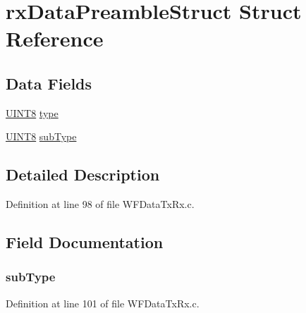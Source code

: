 \hypertarget{structrx_data_preamble_struct}{}\section{rx\+Data\+Preamble\+Struct Struct Reference}
\label{structrx_data_preamble_struct}
\subsection*{Data Fields}
\begin{DoxyCompactItemize}
\item 
\hyperlink{_generic_type_defs_8h_ab27e9918b538ce9d8ca692479b375b6a}{U\+I\+N\+T8} \hyperlink{structrx_data_preamble_struct_a631bceb766461ab7475c7ed56717aac8}{type}
\item 
\hyperlink{_generic_type_defs_8h_ab27e9918b538ce9d8ca692479b375b6a}{U\+I\+N\+T8} \hyperlink{structrx_data_preamble_struct_a6b8a16b4fff234af40d01cd46be5be45}{sub\+Type}
\end{DoxyCompactItemize}


\subsection{Detailed Description}


Definition at line 98 of file W\+F\+Data\+Tx\+Rx.\+c.



\subsection{Field Documentation}
\hypertarget{structrx_data_preamble_struct_a6b8a16b4fff234af40d01cd46be5be45}{}
\subsubsection[{sub\+Type}]{ sub\+Type}\label{structrx_data_preamble_struct_a6b8a16b4fff234af40d01cd46be5be45}


Definition at line 101 of file W\+F\+Data\+Tx\+Rx.\+c.

\hypertarget{structrx_data_preamble_struct_a631bceb766461ab7475c7ed56717aac8}{}
